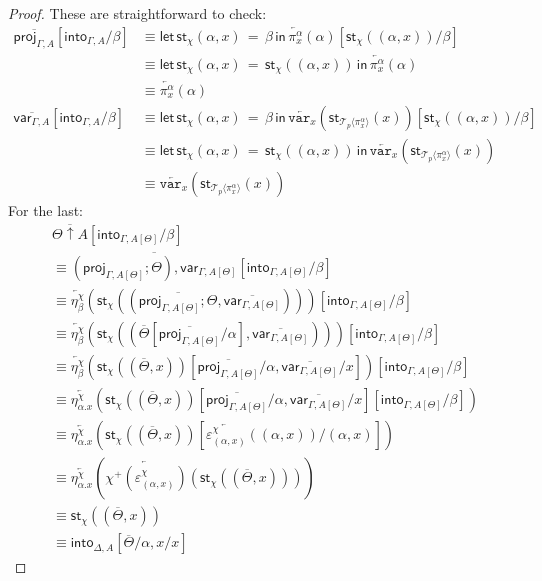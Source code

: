 \documentclass[10pt]{article}
\theoremstyle{definition}
\newcommand{\rewrite}[2]{\overleftarrow{#1}(#2)}
\newcommand\StI[2]{\ensuremath{\mathsf{st}_{#1}(#2)}}
\newcommand\StE[4]{\ensuremath{\mathsf{let} \, \StI{#1}{#3} \, = \, {#2} \, \mathsf{in} \, #4}}
\newcommand\TrPlus[2]{\ensuremath{{#1}^+(#2)}}
\newcommand\ApEl[2]{\mathcal{T}_{#1}\langle#2\rangle}
\newcommand{\upstairs}[1]{\overline{#1}}
\newcommand\proj[1]{\ensuremath{\mathsf{proj}_{#1}}}
\newcommand\qvar[1]{\ensuremath{\mathsf{var}_{#1}}}
\newcommand\into[1]{\ensuremath{\mathsf{into}_{#1}}}
\newcommand\var[1]{\ensuremath{\mathtt{var}_{#1}}}
\begin{document}
\begin{proof}
These are straightforward to check:
\begin{align*}
\upstairs{\proj{\Gamma, A}}[\into{\Gamma, A}/\beta] 
&\equiv \StE{\chi}{\beta}{\alpha, x}{\rewrite{\pi^{\alpha}_{x}}{\alpha}}[\StI{\chi}{(\alpha, x)}/\beta] \\
&\equiv \StE{\chi}{\StI{\chi}{(\alpha, x)}}{\alpha, x}{\rewrite{\pi^{\alpha}_{x}}{\alpha}} \\
&\equiv \rewrite{\pi^\alpha_x}{\alpha} \\
\upstairs{\qvar{\Gamma, A}}[\into{\Gamma, A}/\beta]
&\equiv  \StE{\chi}{\beta}{\alpha, x}{\rewrite{\var{x}}{\StI{\ApEl{p}{\pi^\alpha_x}}{x}}}[\StI{\chi}{(\alpha, x)}/\beta]  \\
&\equiv  \StE{\chi}{\StI{\chi}{(\alpha, x)}}{\alpha, x}{\rewrite{\var{x}}{\StI{\ApEl{p}{\pi^\alpha_x}}{x}}}  \\
&\equiv \rewrite{\var{x}}{\StI{\ApEl{p}{\pi^{\alpha}_x}}{x}}
\end{align*}
For the last:
\begin{align*}
&\upstairs{\Theta \uparrow A}[\into{\Gamma, A[\Theta]}/\beta] \\
&\equiv \upstairs{(\proj{\Gamma, A[\Theta]}; \Theta) , \qvar{\Gamma, A[\Theta]}} [\into{\Gamma, A[\Theta]}/\beta] \\
&\equiv \rewrite{\eta^\chi_\beta}{\StI{\chi}{(\upstairs{\proj{\Gamma, A[\Theta]}; \Theta}, \upstairs{\qvar{\Gamma, A[\Theta]}})}}[\into{\Gamma, A[\Theta]}/\beta] \\
&\equiv \rewrite{\eta^\chi_\beta}{\StI{\chi}{(\upstairs{\Theta}[\upstairs{\proj{\Gamma, A[\Theta]}}/\alpha], \upstairs{\qvar{\Gamma, A[\Theta]}})}}[\into{\Gamma, A[\Theta]}/\beta] \\
&\equiv \rewrite{\eta^\chi_\beta}{\StI{\chi}{(\upstairs{\Theta}, x)}[\upstairs{\proj{\Gamma, A[\Theta]}}/\alpha, \upstairs{\qvar{\Gamma, A[\Theta]}}/x]}[\into{\Gamma, A[\Theta]}/\beta] \\
&\equiv \rewrite{\eta^\chi_{\alpha.x}}{\StI{\chi}{(\upstairs{\Theta}, x)}[\upstairs{\proj{\Gamma, A[\Theta]}}/\alpha, \upstairs{\qvar{\Gamma, A[\Theta]}}/x][\into{\Gamma, A[\Theta]}/\beta]} \\
&\equiv \rewrite{\eta^\chi_{\alpha.x}}{\StI{\chi}{(\upstairs{\Theta}, x)}[\rewrite{\varepsilon^\chi_{(\alpha,x)}}{(\alpha,x)}/(\alpha,x)]} \\
&\equiv \rewrite{\eta^\chi_{\alpha.x}}{\rewrite{\TrPlus{\chi}{\varepsilon^\chi_{(\alpha,x)}}}{\StI{\chi}{(\upstairs{\Theta}, x)}}} \\
&\equiv \StI{\chi}{(\upstairs{\Theta}, x)} \\
&\equiv \into{\Delta, A}[\upstairs{\Theta}/\alpha, x / x]
\end{align*}
\end{proof}
\end{document}

